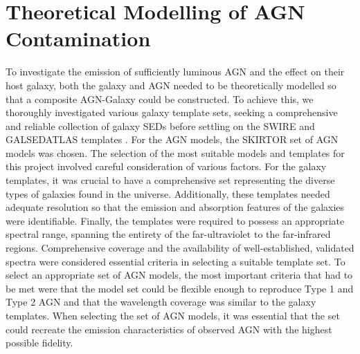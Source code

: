\section{Theoretical Modelling of AGN Contamination}
To investigate the emission of sufficiently luminous AGN and the effect on their host galaxy, both the galaxy and AGN needed to be theoretically modelled so that a composite AGN-Galaxy could be constructed. To achieve this, we thoroughly investigated various galaxy template sets, seeking a comprehensive and reliable collection of galaxy SEDs before settling on the SWIRE \citep{polletta_spectral_2007} and GALSEDATLAS templates \citep{brown_atlas_2014}. For the AGN models, the SKIRTOR \citep{stalevski_3d_2012} set of AGN models was chosen. The selection of the most suitable models and templates for this project involved careful consideration of various factors. For the galaxy templates, it was crucial to have a comprehensive set representing the diverse types of galaxies found in the universe. Additionally, these templates needed adequate resolution so that the emission and absorption features of the galaxies were identifiable. Finally, the templates were required to possess an appropriate spectral range, spanning the entirety of the far-ultraviolet to the far-infrared regions. Comprehensive coverage and the availability of well-established, validated spectra were considered essential criteria in selecting a suitable template set. To select an appropriate set of AGN models, the most important criteria that had to be met were that the model set could be flexible enough to reproduce Type 1 and Type 2 AGN and that the wavelength coverage was similar to the galaxy templates. When selecting the set of AGN models, it was essential that the set could recreate the emission characteristics of observed AGN with the highest possible fidelity.
